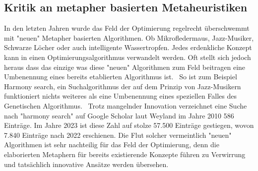 \subsection{Kritik an metapher basierten Metaheuristiken}
In den letzten Jahren wurde das Feld der Optimierung regelrecht überschwemmt mit "neuen" Metapher basierten Algorithmen. Ob Mikrofledermaus, Jazz-Musiker, Schwarze Löcher oder auch intelligente Wassertropfen. Jedes erdenkliche Konzept kann in einen Optimierungsalgorithmus verwandelt werden. Oft stellt sich jedoch heraus dass das einzige was diese "neuen" Algorithmen zum Feld beitragen eine Umbenennung eines bereits etablierten Algorithmus ist.~\cite*{NoNovelty} So ist zum Beispiel Harmony search, ein Suchalgorithmus der auf dem Prinzip von Jazz-Musikern funktioniert nichts weiteres als eine Umbenennung eines speziellen Falles des Genetischen Algorithmus.~\cite*{HarmonySearch} Trotz mangelnder Innovation verzeichnet eine Suche nach "harmony search" auf Google Scholar laut Weyland im Jahre 2010 586 Einträge. Im Jahre 2023 ist diese Zahl auf stolze 57.500 Einträge gestiegen, wovon 7.840 Einträge nach 2022 erschienen. Die Flut solcher vermeintlich "neuen" Algorithmen ist sehr nachteilig für das Feld der Optimierung, denn die elaborierten Metaphern für bereits existierende Konzepte führen zu Verwirrung und tatsächlich innovative Ansätze werden übersehen.~\cite*{MetaheuristicsExposed}